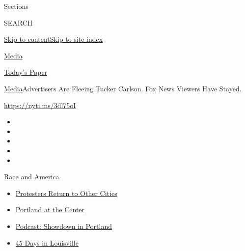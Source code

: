 Sections

SEARCH

\protect\hyperlink{site-content}{Skip to
content}\protect\hyperlink{site-index}{Skip to site index}

\href{https://www.nytimes.com/section/business/media}{Media}

\href{https://myaccount.nytimes.com/auth/login?response_type=cookie\&client_id=vi}{}

\href{https://www.nytimes.com/section/todayspaper}{Today's Paper}

\href{/section/business/media}{Media}\textbar{}Advertisers Are Fleeing
Tucker Carlson. Fox News Viewers Have Stayed.

\url{https://nyti.ms/3dl75oI}

\begin{itemize}
\item
\item
\item
\item
\item
\end{itemize}

\href{https://www.nytimes.com/news-event/george-floyd-protests-minneapolis-new-york-los-angeles?action=click\&pgtype=Article\&state=default\&region=TOP_BANNER\&context=storylines_menu}{Race
and America}

\begin{itemize}
\tightlist
\item
  \href{https://www.nytimes.com/2020/07/26/us/protests-portland-seattle-trump.html?action=click\&pgtype=Article\&state=default\&region=TOP_BANNER\&context=storylines_menu}{Protesters
  Return to Other Cities}
\item
  \href{https://www.nytimes.com/2020/07/24/us/portland-oregon-protests-white-race.html?action=click\&pgtype=Article\&state=default\&region=TOP_BANNER\&context=storylines_menu}{Portland
  at the Center}
\item
  \href{https://www.nytimes.com/2020/07/23/podcasts/the-daily/portland-protests.html?action=click\&pgtype=Article\&state=default\&region=TOP_BANNER\&context=storylines_menu}{Podcast:
  Showdown in Portland}
\item
  \href{https://www.nytimes.com/interactive/2020/07/16/us/black-lives-matter-protests-louisville-breonna-taylor.html?action=click\&pgtype=Article\&state=default\&region=TOP_BANNER\&context=storylines_menu}{45
  Days in Louisville}
\end{itemize}

